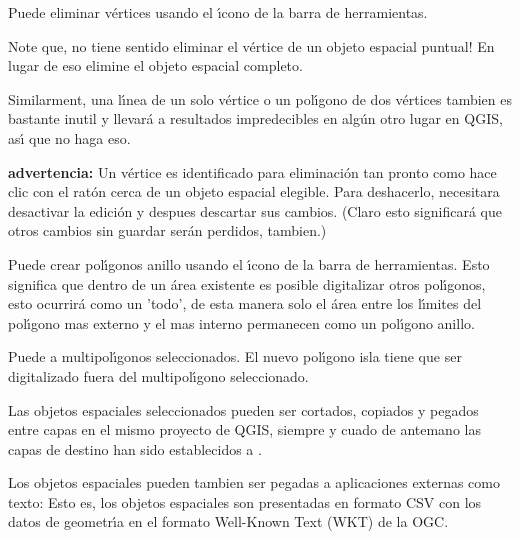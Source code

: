 Puede eliminar v\'ertices usando el \'{\i}cono 
de la barra de herramientas.

Note que, no tiene sentido eliminar el v\'ertice de un objeto espacial puntual!
En lugar de eso elimine el objeto espacial completo.

Similarment, una l\'{\i}nea de un solo v\'ertice o un pol\'{\i}gono de dos v\'ertices tambien es
bastante inutil y llevar\'a a resultados impredecibles en alg\'un otro lugar en
QGIS, as\'{\i} que no haga eso.

\textbf{advertencia:} Un v\'ertice es identificado para eliminaci\'on tan pronto 
como hace clic con el rat\'on cerca de un objeto espacial elegible.
Para deshacerlo, necesitara desactivar
la edici\'on y despues descartar sus cambios.
(Claro esto significar\'a que otros cambios sin guardar ser\'an perdidos, tambien.)


Puede crear pol\'{\i}gonos anillo usando el \'{\i}cono 
de la barra de herramientas. Esto significa que dentro de un \'area existente es posible digitalizar
otros pol\'{\i}gonos, esto ocurrir\'a como un 'todo', de esta manera solo 
el \'area entre los l\'{\i}mites del pol\'{\i}gono mas externo y el mas interno permanecen 
como un pol\'{\i}gono anillo. 


Puede  a multipol\'{\i}gonos seleccionados. 
El nuevo pol\'{\i}gono isla tiene que ser digitalizado fuera del multipol\'{\i}gono seleccionado. 


Las objetos espaciales seleccionados pueden ser cortados, copiados y pegados entre capas en el mismo proyecto
de QGIS, siempre y cuado de antemano las capas de destino han sido establecidos a  
.

Los objetos espaciales pueden tambien ser pegadas a aplicaciones externas como texto:  Esto es,
los objetos espaciales son presentadas en formato CSV con los datos de geometr\'{\i}a 
en el formato Well-Known Text (WKT) de la OGC.


